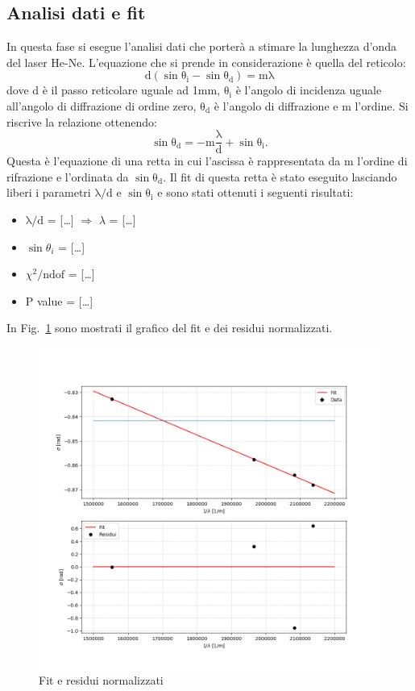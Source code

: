 \documentclass[10pt,a4paper]{article}
\newcommand{\rem}[1]{[\emph{#1}]}
\begin{document}
\subsection*{Analisi dati e fit}
In questa fase si esegue l'analisi dati che porterà a stimare la lunghezza d'onda del laser He-Ne. L'equazione che si prende in considerazione è quella del reticolo:
\begin{equation*}
\mathrm{d(\sin\theta_i - \sin\theta_d) = m\lambda}
\end{equation*}
 dove d è il passo reticolare uguale ad 1mm, $\mathrm{\theta_i}$ è l'angolo di incidenza uguale all'angolo di diffrazione di ordine zero, $\mathrm{\theta_d}$ è l'angolo di diffrazione e m l'ordine. \newline
 Si riscrive la relazione ottenendo:
 \begin{equation*}
 \mathrm{\sin\theta_d} = \mathrm{-m\frac{\lambda}{d} + \sin\theta_i}.
 \end{equation*}
 Questa è l'equazione di una retta in cui l'ascissa è rappresentata da m l'ordine di rifrazione e l'ordinata da $\mathrm{\sin\theta_d}$.
 Il fit di questa retta è stato eseguito lasciando liberi i parametri $\mathrm{\lambda/d}$ e $\mathrm{\sin\theta_i}$ e sono stati ottenuti i seguenti risultati:
\begin{itemize}
\item[] $\mathrm{\lambda/d}$ = \rem{\dots} $\Rightarrow$ $\lambda$ = \rem{\dots}
\item[] $\sin\theta_i$ = \rem{\dots}
\item[] $\chi^2/\mathrm{ndof}$ = \rem{\dots}
\item[] P value = \rem{\dots}
\end{itemize} 
\newpage
\noindent In Fig.~\ref{fig:fit} sono mostrati il grafico del fit e dei residui normalizzati.
\begin{figure}[h!]
	\centering
	\includegraphics[scale=0.5]{fit_calibro}
	\caption{Fit e residui normalizzati}
	\label{fig:fit}
\end{figure}
\end{document}
